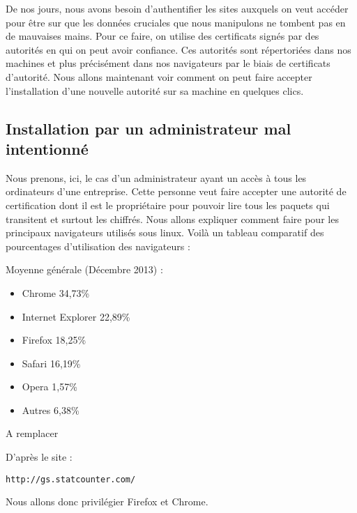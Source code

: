 De nos jours, nous avons besoin d'authentifier les sites auxquels on veut accéder pour être sur que les données cruciales que nous manipulons ne tombent pas en de mauvaises mains. Pour ce faire, on utilise des certificats signés par des autorités en qui on peut avoir confiance.
Ces autorités sont répertoriées dans nos machines et plus précisément dans nos navigateurs par le biais de certificats d'autorité.
Nous allons maintenant voir comment on peut faire accepter l'installation d'une nouvelle autorité sur sa machine en quelques clics.




\subsection{Installation par un administrateur mal intentionné}
Nous prenons, ici, le cas d'un administrateur ayant un accès à tous les ordinateurs d'une entreprise.
Cette personne veut faire accepter une autorité de certification dont il est le propriétaire pour pouvoir lire tous les paquets qui transitent et surtout les chiffrés.
Nous allons expliquer comment faire pour les principaux navigateurs utilisés sous linux.
Voilà un tableau comparatif des pourcentages d'utilisation des navigateurs : 

Moyenne générale (Décembre 2013) :
\begin{itemize}
\item{Chrome} 		34,73\%
\item{Internet Explorer}		 22,89\%
\item{Firefox} 		18,25\%
\item{Safari} 		16,19\%
\item{Opera}	 		1,57\%	
\item{Autres} 		6,38\%
\end{itemize}	

\huge{}
A remplacer

\normalsize{}

D'après le site : \begin{verbatim}
http://gs.statcounter.com/
\end{verbatim}

Nous allons donc privilégier Firefox et Chrome.
\newpage

